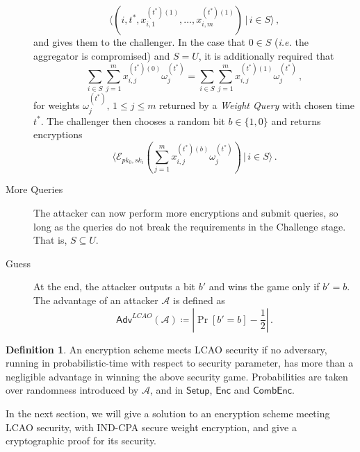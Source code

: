 \documentclass[twocolumn]{autart}
\theoremstyle{definition}
\newtheorem{definition}{Definition}
\theoremstyle{remark}
\begin{document}
\begin{description}
\begin{equation*}
        \langle(i,t^*,x^{(t^*)(1)}_{i,1},\dots,x^{(t^*)(1)}_{i,m})\,|\, i \in S\rangle\,,
    \end{equation*}
    and gives them to the challenger. In the case that $0 \in S$ (\textit{i.e.} the aggregator is compromised) and $S = U$, it is additionally required that
    \begin{equation*}
        \sum_{i\in S}\sum^{m}_{j=1} x^{(t^*)(0)}_{i,j}\omega^{(t^*)}_j = \sum_{i \in S}\sum^{m}_{j=1} x^{(t^*)(1)}_{i,j}\omega^{(t^*)}_j\,,
    \end{equation*}
    for weights $\omega^{(t^*)}_j,\,1\leq j \leq m$ returned by a \textit{Weight Query} with chosen time $t^*$. The challenger then chooses a random bit $b \in \{1,0\}$ and returns encryptions 
    \begin{equation*}
        \langle\mathcal{E}_{pk_0,sk_i}(\sum^m_{j=1}x^{(t^*)(b)}_{i,j}\omega^{(t^*)}_j)\,|\,i\in S\rangle\,.
    \end{equation*}
    \item[More Queries] The attacker can now perform more encryptions and submit queries, so long as the queries do not break the requirements in the Challenge stage. That is, $S \subseteq U$.
    \item[Guess] At the end, the attacker outputs a bit $b'$ and wins the game only if $b' = b$. The advantage of an attacker $\mathcal{A}$ is defined as
    \begin{equation*}
        \mathsf{Adv}^{LCAO}(\mathcal{A}) \coloneqq \left\lvert \Pr [b'=b] - \frac{1}{2}\right\rvert\,.
    \end{equation*} 
\end{description}

\begin{definition}
    An encryption scheme meets LCAO security if no adversary, running in probabilistic-time with respect to security parameter, has more than a negligible advantage in winning the above security game. Probabilities are taken over randomness introduced by $\mathcal{A}$, and in $\mathsf{Setup}$, $\mathsf{Enc}$ and $\mathsf{CombEnc}$.
\end{definition}

In the next section, we will give a solution to an encryption scheme meeting LCAO security, with IND-CPA secure weight encryption, and give a cryptographic proof for its security.
\end{document}
